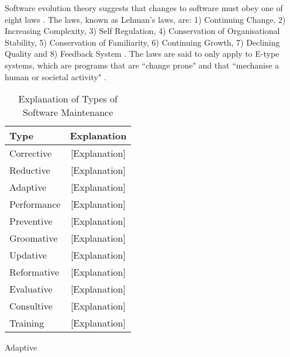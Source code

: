 \documentclass{sig-alternate}
\begin{document}
Software evolution theory suggests that changes to software must obey one of eight laws \cite{lehman1980programs}. The laws, known as Lehman's laws, are: 1) Continuing Change, 2) Increasing Complexity, 3) Self Regulation, 4) Conservation of Organisational Stability, 5) Conservation of Familiarity, 6) Continuing Growth, 7) Declining Quality and 8) Feedback System \cite{lehman1980programs}. The laws are said to only apply to E-type systems, which are programs that are ``change prone" and that ``mechanise a human or societal activity" \cite{lehman1980programs}.     

\begin{table}
       \centering
       \begin{tabular}[ht]{l|c}
              \toprule

              \textbf{Type}                              & \textbf{Explanation}    \\ \midrule
              Corrective    & [Explanation]                      \\ \hline
              Reductive     & [Explanation]                     \\ \hline
              Adaptive      & [Explanation]                      \\ \hline
              Performance   & [Explanation]                     \\ \hline
              Preventive    & [Explanation]                      \\ \hline
              Groomative    & [Explanation]                      \\ \hline
              Updative      & [Explanation]                     \\ \hline
              Reformative   & [Explanation]                     \\ \hline
              Evaluative    & [Explanation]                     \\ \hline
              Consultive    & [Explanation]                     \\ \hline
              Training      & [Explanation]                     \\ 

              \bottomrule

       \end{tabular}
       \caption{Explanation of Types of Software Maintenance}
       \label{table:expl_types}
\end{table}


Adaptive
\end{document}
